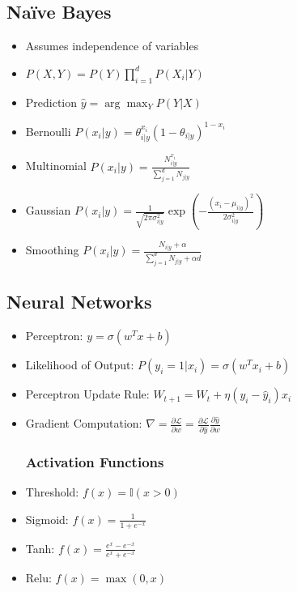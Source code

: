 \documentclass[a4paper,7pt]{extarticle}
\theoremstyle{definition}
\begin{document}
\begin{multicols*}{2}
\begin{itemize}
\subsection{Naïve Bayes}

\begin{itemize}
\item Assumes independence of variables
\item \( P(X, Y) = P(Y) \prod_{i=1}^d P(X_i|Y) \)
\item Prediction  \( \hat{y} = \arg\max_Y P(Y|X) \)
\item Bernoulli   \( P(x_i|y) = \theta_{i|y}^{x_i} (1 - \theta_{i|y})^{1 - x_i} \)
\item Multinomial \( P(x_i|y) = \frac{N_{i|y}^{x_i}}{\sum_{j=1}^d N_{j|y}} \)
\item Gaussian    \( P(x_i|y) = \frac{1}{\sqrt{2 \pi \sigma_{i|y}^2}} \exp \left( - \frac{(x_i - \mu_{i|y})^2}{2 \sigma_{i|y}^2} \right) \)
\item Smoothing   \( P(x_i|y) = \frac{N_{i|y} + \alpha}{\sum_{j=1}^d N_{j|y} + \alpha d} \)
\end{itemize}

\subsection{Neural Networks}

\begin{itemize}
\item Perceptron: \( y = \sigma(w^T x + b) \)
\item Likelihood of Output: \( P(y_i = 1|x_i) = \sigma(w^T x_i + b) \)
\item Perceptron Update Rule: \( W_{t+1} = W_t + \eta(y_i - \hat{y}_i) x_i \)
\item Gradient Computation: \( \nabla = \frac{\partial \mathcal{L}}{\partial w} = \frac{\partial \mathcal{L}}{\partial \hat{y}} \frac{\partial \hat{y}}{\partial w} \)

\subsubsection{Activation Functions}
\item Threshold: \( f(x) = \mathbb{I}(x > 0) \)
\item Sigmoid: \( f(x) = \frac{1}{1 + e^{-x}} \)
\item Tanh: \( f(x) = \frac{e^x - e^{-x}}{e^x + e^{-x}} \)
\item Relu: \( f(x) = \max(0, x) \)


\end{itemize}
\end{itemize}
\end{multicols*}
\end{document}
